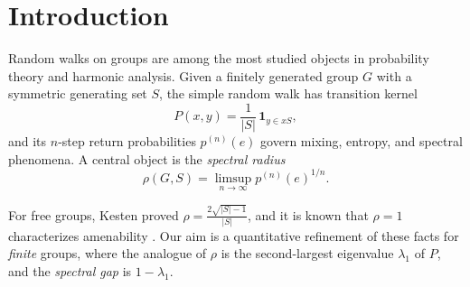 \begin{abstract}
We establish sharp spectral gap estimates for random walks on Cayley graphs of
finite groups, extending the classical Kesten bound to non-abelian settings.
\end{abstract}

\tableofcontents

\section{Introduction}
\label{sec:intro}
Random walks on groups are among the most studied objects in probability theory
and harmonic analysis. Given a finitely generated group $G$ with a symmetric
generating set $S$, the simple random walk has transition kernel
\begin{equation}
\label{eq:kernel}
P(x, y) = \frac{1}{|S|} \, \mathbf{1}_{y \in x S},
\end{equation}
and its $n$-step return probabilities $p^{(n)}(e)$ govern mixing, entropy, and
spectral phenomena. A central object is the \emph{spectral radius}
\begin{equation}
\label{eq:rho}
\rho(G, S) = \limsup_{n \to \infty} p^{(n)}(e)^{1/n}.
\end{equation}

For free groups, Kesten proved $\rho = \frac{2\sqrt{|S|-1}}{|S|}$, and it is
known that $\rho = 1$ characterizes amenability \cite{Kesten1959, Woess2000}.
Our aim is a quantitative refinement of these facts for \emph{finite} groups,
where the analogue of $\rho$ is the second-largest eigenvalue $\lambda_1$ of
$P$, and the \emph{spectral gap} is $1 - \lambda_1$.
